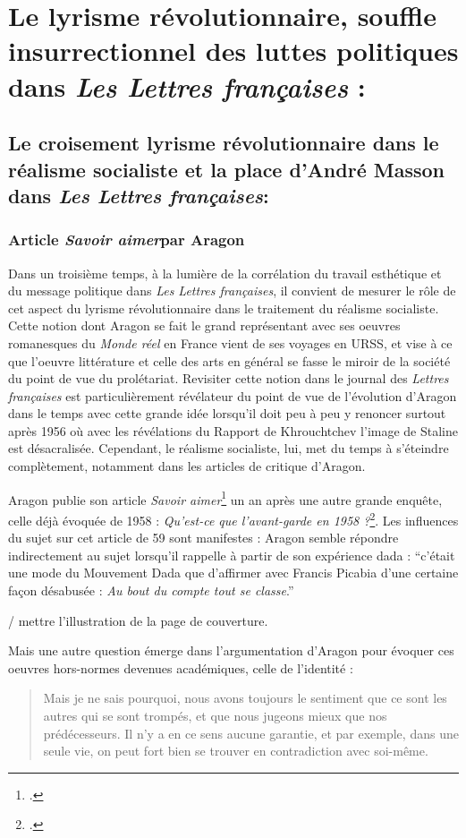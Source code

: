 \chapter{Le lyrisme révolutionnaire, souffle insurrectionnel des luttes politiques dans \emph{Les Lettres françaises} :}

\section{Le croisement lyrisme révolutionnaire dans le réalisme socialiste  et la place d’André Masson dans \emph{Les Lettres françaises}:}

\subsection{Article \emph{Savoir aimer}par Aragon}

Dans un troisième temps, à la lumière de la corrélation du travail esthétique et du message politique dans \emph{Les Lettres françaises}, il convient de mesurer le rôle de cet aspect du lyrisme révolutionnaire dans le traitement du réalisme socialiste. Cette notion dont Aragon se fait le grand représentant avec ses oeuvres romanesques du \emph{Monde réel} en France vient de ses voyages en URSS, et vise à ce que l’oeuvre littérature et celle des arts en général se fasse le miroir de la société du point de vue du prolétariat. Revisiter cette notion dans le journal des \emph{Lettres françaises} est particulièrement révélateur du point de vue de l’évolution d’Aragon dans le temps avec cette grande idée lorsqu’il doit peu à peu y renoncer surtout après 1956 où avec les révélations du Rapport de Khrouchtchev l’image de Staline est désacralisée. Cependant, le réalisme socialiste, lui, met du temps à s’éteindre complètement, notamment dans les articles de critique d’Aragon. 

	 Aragon publie son article \emph{Savoir aimer}\footcite{savoiraimer} un an après une autre grande enquête, celle déjà évoquée de 1958 : \emph{Qu’est-ce que l’avant-garde en 1958 ?}\footcite{avantgarde}. Les influences du sujet sur cet article de 59 sont manifestes : Aragon semble répondre indirectement au sujet lorsqu’il rappelle à partir de son expérience dada : \enquote{c’était une mode du Mouvement Dada que d’affirmer avec Francis Picabia d’une certaine façon désabusée : \emph{Au bout du compte tout se classe}.}

 / mettre l'illustration de la page de couverture. 

 Mais une autre question émerge dans l’argumentation d’Aragon pour évoquer ces oeuvres hors-normes devenues académiques, celle de l’identité :  
 \begin{quote}
  Mais je ne sais pourquoi, nous avons toujours le sentiment que ce sont les autres qui se sont trompés, et que nous jugeons mieux que nos prédécesseurs. Il n’y a en ce sens aucune garantie, et par exemple, dans une seule vie, on peut fort bien se trouver en contradiction avec soi-même.    
 \end{quote}

